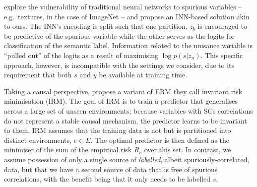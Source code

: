 \citet{JacBehZemBet19} explore the vulnerability of traditional neural networks to spurious
variables -- e.g.\ textures, in the case of ImageNet \citep{Geir18} -- and propose an
\ac{INN}-based solution akin to ours. 
%
The \ac{INN}'s encoding is split such that one partition, $z_b$ is encouraged to be predictive of
the spurious variable while the other serves as the logits for classification of the semantic
label. 
%
Information related to the nuisance variable is ``pulled out'' of the logits as a result of
maximising $\log p(s|z_n)$. 
%
This specific approach, however, is incompatible with the settings we consider, due to its
requirement that both $s$ and $y$ be available at training time.

Taking a causal perspective, \citet{arjovsky2019invariant} propose a variant of \ac{ERM} they call
invariant risk minimisation (IRM).
%
The goal of IRM is to train a predictor that generalises across a large set of unseen environments;
because variables with \aclp{SC} correlations do not represent a stable causal mechanism, the
predictor learns to be invariant to them.
%
IRM assumes that the training data is not \emph{\iid{}} but is partitioned into distinct
environments, $e \in E$.
%
The optimal predictor is then defined as the minimiser of the sum of the empirical risk $R_e$ over
this set.
%
In contrast, we assume possession of only a single source of \emph{labelled}, albeit
spuriously-correlated, data, but that we have a second source of data that is free of spurious
correlations, with the benefit being that it only needs to be labelled \emph{\wrt{} $s$}.


